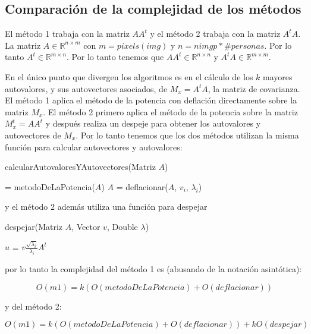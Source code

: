 \subsection{Comparación de la complejidad de los métodos}
El método 1 trabaja con la matriz $AA^t$ y el método 2 trabaja con la matriz $A^tA$.
La matriz $A\in\mathbb{R}^{n \times m}$ con $m = pixels(img)$ y $n = nimgp * \#personas$. Por lo tanto $A^t\in\mathbb{R}^{m \times n}$.
Por lo tanto tenemos que $AA^t\in\mathbb{R}^{n \times n}$ y $A^tA\in\mathbb{R}^{m \times m}$.

En el \'unico punto que divergen los algoritmos es en el c\'alculo de los $k$ mayores autovalores, y sus
autovectores asociados, de $M_x = A^tA$, la matriz de covarianza. 
El m\'etodo 1 aplica el m\'etodo de la potencia con deflaci\'on directamente sobre la matriz $M_x$. 
El m\'etodo 2 primero aplica el m\'etodo de la potencia sobre la matriz $M^t_x = AA^t$ y después realiza un despeje para obtener los 
autovalores y autovectores de $M_x$. 
Por lo tanto tenemos que los dos métodos utilizan la misma función para calcular autovectores y autovalores:
\begin{algorithm}
\caption{calcularAutovaloresYAutovectores(Matriz $A$)}
\label{pseudo:calcularAutovaloresYAutovectores}
\begin{algorithmic}
  \STATE [$v_i$, $\lambda_i$] = metodoDeLaPotencia($A$)
  \STATE $A$ = deflacionar($A$, $v_i$, $\lambda_i$)
\ENDFOR
\end{algorithmic}
\end{algorithm}

y el método 2 además utiliza una función para despejar

\begin{algorithm}
\caption{despejar(Matriz $A$, Vector $v$, Double $\lambda$)}
\label{pseudo:despejar}
\begin{algorithmic}
  \STATE $u$ = $v\frac{ \sqrt{\lambda_{i} } }{ \lambda_{i} }  A^{t}$   
\end{algorithmic}
\end{algorithm}

por lo tanto la complejidad del método 1 es (abusando de la notación asintótica):

\begin{displaymath}
  O(m1) = k (O(metodoDeLaPotencia) + O(deflacionar))
\end{displaymath}

y del método 2:

\begin{displaymath}
  O(m1) = k (O(metodoDeLaPotencia) + O(deflacionar)) + k O(despejar)
\end{displaymath}

